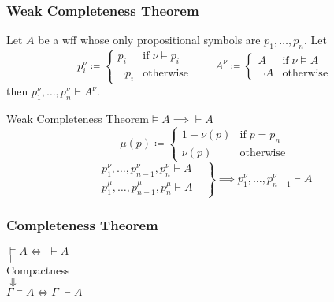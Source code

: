 \documentclass[UTF8,11pt,colorlinks,compress,openany]{beamer}%
\begin{document}
\begin{frame}\frametitle{Weak Completeness Theorem}
	\begin{lemma}
		Let $A$ be a wff whose only propositional symbols are $p_1,\dots,p_n$. Let
		\[p_i^\nu\coloneqq 
		\begin{cases}
		p_i &\text{if}\;\nu\vDash p_i\\
		\neg p_i &\text{otherwise}
		\end{cases}\qquad
		 A^\nu\coloneqq 
		\begin{cases}
		 A &\text{if}\;\nu\vDash A\\
		\neg A &\text{otherwise}
		\end{cases}\]
		then $p_1^\nu,\dots,p_n^\nu\vdash A^\nu$.
	\end{lemma}
	\begin{block}{Weak Completeness Theorem\quad $\vDash A\implies\vdash A$}
		\[\mu(p)\coloneqq 
		\begin{cases}
		1-\nu(p) &\text{if}\;p=p_n\\
		\nu(p) &\text{otherwise}
		\end{cases}
		\]
		\[
		\left.
		\begin{aligned}
		p_1^\nu,\dots,p_{n-1}^\nu,p_n^\nu\vdash A&\\
		p_1^\mu,\dots,p_{n-1}^\mu,p_n^\mu\vdash A&
		\end{aligned}\right\}\implies p_1^\nu,\dots,p_{n-1}^\nu\vdash A
		\]
	\end{block}
\end{frame}

\begin{frame}\frametitle{Completeness Theorem}
	\begin{center}
		$\vDash A\iff\;\vdash A\;\;$\\
		$+$\\
		Compactness\\
		$\Downarrow$\\
		$\Gamma\vDash A\iff\Gamma\;\vdash A$
	\end{center}
\end{frame}
\end{document}
